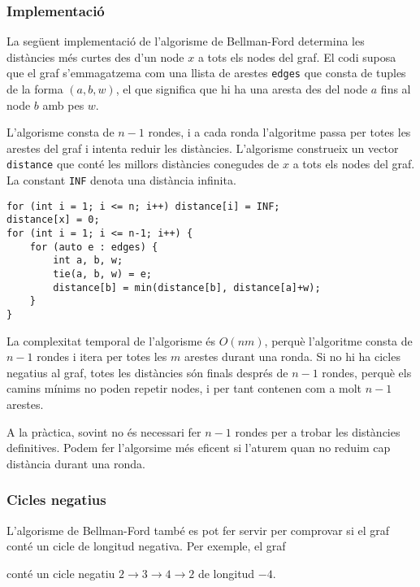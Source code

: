 \subsubsection{Implementació}

La següent implementació de l'algorisme de Bellman-Ford determina les
distàncies més curtes des d'un node $x$ a tots els nodes del graf. El
codi suposa que el graf s'emmagatzema com una llista de arestes
\texttt{edges} que consta de tuples de la forma $(a,b,w)$, el que
significa que hi ha una aresta des del node $a$ fins al node $b$ amb
pes $w$.

L'algorisme consta de $n-1$ rondes, i a cada ronda l'algoritme passa
per totes les arestes del graf i intenta reduir les
distàncies. L'algorisme construeix un vector \texttt{distance} que
conté les millors distàncies conegudes de $x$ a tots els nodes del
graf. La constant \texttt{INF} denota una distància infinita.


\begin{lstlisting}
for (int i = 1; i <= n; i++) distance[i] = INF;
distance[x] = 0;
for (int i = 1; i <= n-1; i++) {
    for (auto e : edges) {
        int a, b, w;
        tie(a, b, w) = e;
        distance[b] = min(distance[b], distance[a]+w);
    }
}
\end{lstlisting}


La complexitat temporal de l'algorisme és $O(nm)$, perquè l'algoritme
consta de $n-1$ rondes i itera per totes les $m$ arestes durant una
ronda. Si no hi ha cicles negatius al graf, totes les distàncies són
finals després de $n-1$ rondes, perquè els camins mínims no poden
repetir nodes, i per tant contenen com a molt $n-1$ arestes.

A la pràctica, sovint no és necessari fer $n-1$ rondes per a trobar
les distàncies definitives. Podem fer l'algorsime més eficent si
l'aturem quan no reduim cap distància durant una ronda.

\subsubsection{Cicles negatius}


L'algorisme de Bellman-Ford també es pot fer servir per comprovar si
el graf conté un cicle de longitud negativa. Per exemple, el graf


\begin{center}
\end{center}
\noindent conté un cicle negatiu $2 \rightarrow 3 \rightarrow 4
\rightarrow 2$ de longitud $-4$.

